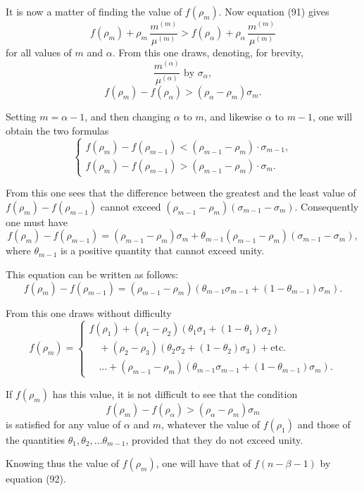 \documentclass{article}
\begin{document}
It is now a matter of finding the value of $f(\rho_m)$.
Now equation (91) gives
\[ f(\rho_m) + \rho_m\,\frac{m^{(m)}}{\mu^{(m)}} > f(\rho_\alpha) + \rho_\alpha\,\frac{m^{(m)}}{\mu^{(m)}} \tag{93} \]
for all values of $m$ and $\alpha$.
From this one draws, denoting, for brevity,
\[ \frac{m^{(\alpha)}}{\mu^{(\alpha)}} \text{ by } \sigma_\alpha, \tag{94} \]
\[ f(\rho_m) - f(\rho_\alpha) > (\rho_\alpha - \rho_m)\sigma_m. \tag{95} \]

Setting $m = \alpha-1$, and then changing $\alpha$ to $m$, and likewise $\alpha$ to $m-1$, one will obtain the two formulas
\[ \begin{cases} f(\rho_m) - f(\rho_{m-1}) < (\rho_{m-1}-\rho_m) \cdot \sigma_{m-1}, \\ f(\rho_m) - f(\rho_{m-1}) > (\rho_{m-1}-\rho_m) \cdot \sigma_m. \end{cases} \tag{96} \]

From this one sees that the difference between the greatest and the least value of $f(\rho_m)-f(\rho_{m-1})$ cannot exceed $(\rho_{m-1}-\rho_m)(\sigma_{m-1}-\sigma_m)$. Consequently one must have
\[ f(\rho_m)-f(\rho_{m-1}) = (\rho_{m-1}-\rho_m)\sigma_m+\theta_{m-1}(\rho_{m-1}-\rho_m)(\sigma_{m-1}-\sigma_m), \]
where $\theta_{m-1}$ is a positive quantity that cannot exceed unity.

This equation can be written as follows:
\[ f(\rho_m)-f(\rho_{m-1}) = (\rho_{m-1}-\rho_m)\left(\theta_{m-1}\sigma_{m-1}+(1-\theta_{m-1})\sigma_m\right). \tag{97} \]

From this one draws without difficulty
\[ f(\rho_m) = \begin{cases}
f(\rho_1)+(\rho_1-\rho_2)\left(\theta_1\sigma_1+(1-\theta_1)\sigma_2\right) \\
\quad + (\rho_2-\rho_3)\left(\theta_2\sigma_2+(1-\theta_2)\sigma_3\right)+\text{etc.} \\
\quad \ldots + (\rho_{m-1}-\rho_m)\left(\theta_{m-1}\sigma_{m-1}+(1-\theta_{m-1})\sigma_m\right).
\end{cases} \tag{98} \]

If $f(\rho_m)$ has this value, it is not difficult to see that the condition
\[ f(\rho_m) - f(\rho_\alpha) > (\rho_\alpha-\rho_m)\sigma_m \]
is satisfied for any value of $\alpha$ and $m$, whatever the value of $f(\rho_1)$ and those of the quantities $\theta_1, \theta_2, \ldots \theta_{m-1}$, provided that they do not exceed unity.

Knowing thus the value of $f(\rho_m)$, one will have that of $f(n-\beta-1)$ by equation (92).
\end{document}
